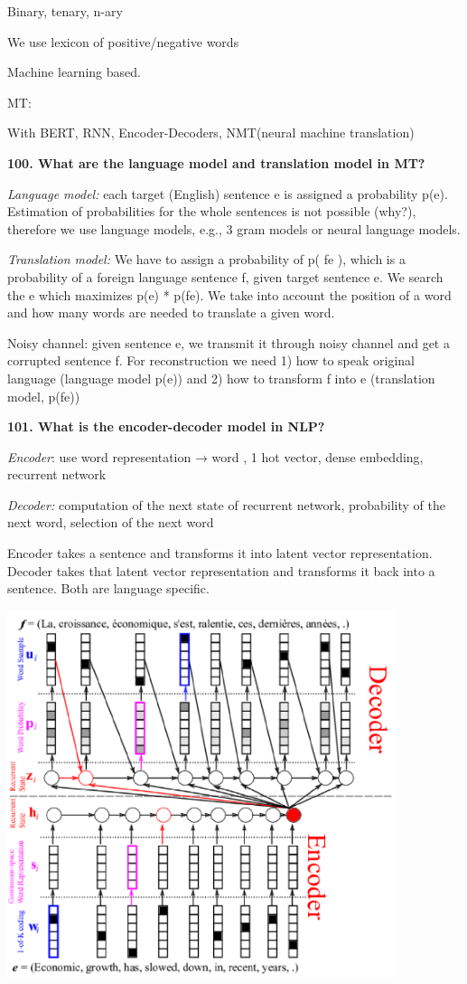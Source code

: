 Binary, tenary, n-ary

We use lexicon of positive/negative words

Machine learning based.

MT:

With BERT, RNN, Encoder-Decoders, NMT(neural machine translation)

\textbf{100. What are the language model and translation model in MT?}

\textit{Language model:} each target (English) sentence e is assigned
a probability p(e). Estimation of probabilities for the whole sentences
is not possible (why?), therefore we use language models, e.g., 3 gram
models or neural language models.

\textit{Translation model:} We have to assign a probability of p(
f\textbar e ), which is a probability of a foreign language sentence f,
given target sentence e. We search the e which maximizes p(e) *
p(f\textbar e). We take into account the position of a word and how many
words are needed to translate a given word.

Noisy channel: given sentence e, we transmit it through noisy channel
and get a corrupted sentence f. For reconstruction we need 1) how to
speak original language (language model p(e)) and 2) how to transform f
into e (translation model, p(f\textbar e))

\textbf{101. What is the encoder-decoder model in NLP?}

\textit{Encoder}: use word representation → word , 1 hot vector,
dense embedding, recurrent network

\textit{Decoder:} computation of the next state of recurrent network,
probability of the next word, selection of the next word

Encoder takes a sentence and transforms it into latent vector
representation. Decoder takes that latent vector representation and
transforms it back into a sentence. Both are language specific.

\includegraphics[width=4.48438in,height=4.22366in]{media/image40.png}

